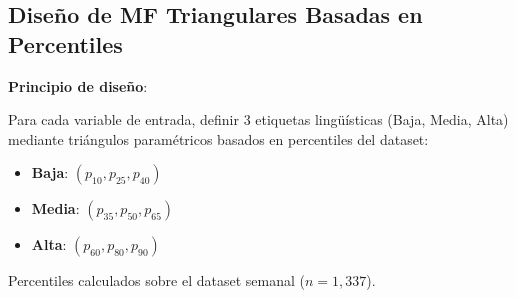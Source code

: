 \documentclass[12pt,letterpaper,twoside]{report}
\begin{document}
\subsection{Diseño de MF Triangulares Basadas en Percentiles}

\begin{reglabox}
\textbf{Principio de diseño}:

Para cada variable de entrada, definir 3 etiquetas lingüísticas (Baja, Media, Alta) mediante triángulos paramétricos basados en percentiles del dataset:

\begin{itemize}[noitemsep]
    \item \textbf{Baja}: $(p_{10}, p_{25}, p_{40})$
    \item \textbf{Media}: $(p_{35}, p_{50}, p_{65})$
    \item \textbf{Alta}: $(p_{60}, p_{80}, p_{90})$
\end{itemize}

Percentiles calculados sobre el dataset semanal ($n=1,337$).
\end{reglabox}
\end{document}
